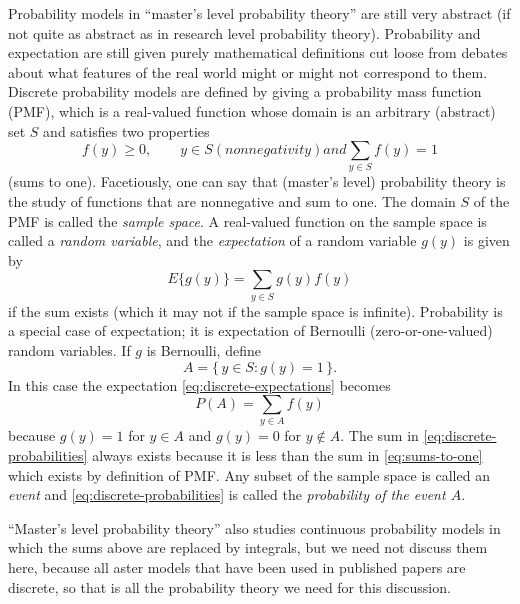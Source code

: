 \documentclass[11pt]{article}
\newcommand{\set}[1]{\{\, #1 \,\}}
\begin{document}
Probability models in ``master's level probability theory'' are still very
abstract (if not quite as abstract as in research level probability theory).
Probability and expectation are still given purely mathematical definitions
cut loose from debates about what features of the real world might or might
not correspond to them.  Discrete probability models are defined by giving
a probability mass function (PMF), which is a real-valued function whose
domain is an arbitrary (abstract) set $S$ and satisfies two properties
\begin{subequations}
\begin{equation} \label{eq:nonnegativity}
   f(y) \ge 0, \qquad y \in S
\end{equation}
(nonnegativity) and
\begin{equation} \label{eq:sums-to-one}
   \sum_{y \in S} f(y) = 1
\end{equation}
\end{subequations}
(sums to one).  Facetiously, one can say that (master's level) probability
theory is the study of functions that are nonnegative and sum to one.
The domain $S$ of the PMF is called the \emph{sample space}.
A real-valued function on the sample space is called a \emph{random variable},
and the \emph{expectation} of a random variable $g(y)$
is given by
\begin{equation} \label{eq:discrete-expectations}
   E\{g(y)\} = \sum_{y \in S} g(y) f(y)
\end{equation}
if the sum exists (which it may not if the sample space is infinite).
Probability is a special case of expectation; it is expectation of Bernoulli
(zero-or-one-valued) random variables.  If $g$ is Bernoulli, define
$$
   A = \set{ y \in S : g(y) = 1 }.
$$
In this case the expectation \eqref{eq:discrete-expectations} becomes
\begin{equation} \label{eq:discrete-probabilities}
   P(A) = \sum_{y \in A} f(y)
\end{equation}
because $g(y) = 1$ for $y \in A$ and $g(y) = 0$ for $y \notin A$.
The sum in \eqref{eq:discrete-probabilities} always exists because it is
less than the sum in \eqref{eq:sums-to-one} which exists by definition of
PMF.  Any subset of the sample space is called an \emph{event}
and \eqref{eq:discrete-probabilities} is called
the \emph{probability of the event $A$}.

``Master's level probability theory'' also studies continuous probability
models in which the sums above are replaced by integrals, but we need not
discuss them here, because all aster models that have been used in published
papers are discrete, so that is all the probability theory we need for this
discussion.
\end{document}
